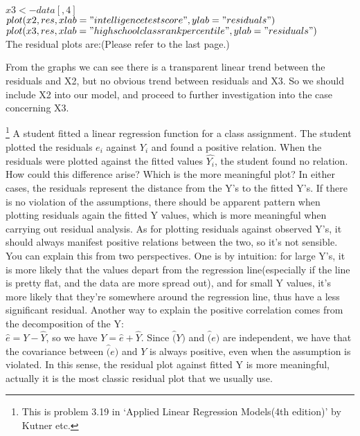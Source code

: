 \documentclass[12pt]{article}
\begin{document}
{$x3 <- data[,4]$\\
$plot(x2,res,xlab="intelligence test score",ylab="residuals")$\\
$plot(x3,res,xlab="high school class rank percentile",ylab="residuals")$\\
The residual plots are:(Please refer to the last page.)
\begin{figure}[ht]
  \centering
\end{figure}
From the graphs we can see there is a transparent linear trend between the residuals and X2, but no obvious trend between residuals and X3. So we should include X2 into
our model, and proceed to further investigation into the case concerning X3.\\
 }

 {\footnote[2]{This is
problem 3.19 in `Applied Linear Regression Models(4th edition)' by
Kutner etc.} 
 A student fitted a linear regression function for a class assignment. The student plotted the residuals $e_i$ against $Y_i$ and found a positive relation. When the residuals were plotted against the fitted values $\hat{Y_i}$, the student found no relation. How could this difference arise? Which is the more meaningful plot?
} { \vfill
  \answer
} { In either cases, the residuals represent the distance from the
Y's to the fitted Y's. If there is no violation of the assumptions,
there should be apparent pattern when plotting residuals again the
fitted Y values, which is more meaningful when carrying out residual
analysis. As for plotting residuals against observed Y's, it should
always manifest positive relations between the two, so it's not
sensible. You can explain this from two perspectives. One is by
intuition: for large Y's, it is more likely that the values depart
from the regression line(especially if the line is pretty flat, and
the data are more spread out), and for small Y values, it's more
likely that they're somewhere around the regression line, thus have
a less significant residual.  Another way to explain the positive
correlation comes from the decomposition of the Y:\\
$\hat{e}=Y-\hat{Y}$, so we have $Y=\hat{e}+\hat{Y}$. Since $\hat(Y)$
and $\hat(e)$ are independent, we have that the covariance between
$\hat(e)$ and $Y$ is always positive, even when the assumption is
violated. In this sense, the residual plot against fitted Y is more
meaningful, actually it is the most classic residual plot that we
usually use. }
\end{document}
